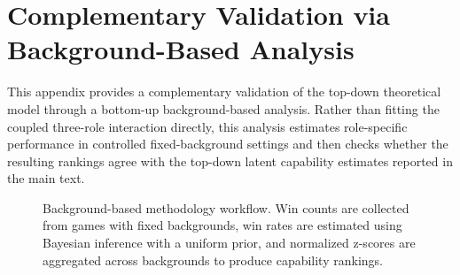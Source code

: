 \documentclass{article}
\begin{document}
\begin{table}[t]
    \centering
    \caption{Detect-parameter MCMC diagnostics.}
    \label{tab:mcmc_detect}
\end{table}


\section{Complementary Validation via Background-Based Analysis}
\label{appendix:background_analysis}

This appendix provides a complementary validation of the top-down theoretical model through a bottom-up background-based analysis. Rather than fitting the coupled three-role interaction directly, this analysis estimates role-specific performance in controlled fixed-background settings and then checks whether the resulting rankings agree with the top-down latent capability estimates reported in the main text.

\begin{figure}[t!]
    \centering
    
    \caption{Background-based methodology workflow. Win counts are collected from games with fixed backgrounds, win rates are estimated using Bayesian inference with a uniform prior, and normalized z-scores are aggregated across backgrounds to produce capability rankings.}
    \label{fig:benchmark_background}
\end{figure}
\end{document}
